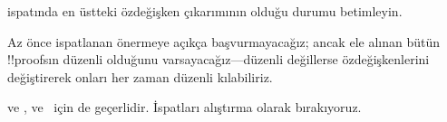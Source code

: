 \documentclass[../../../include/open-logic-section]{subfiles}
\begin{document}
\begin{prob}
 ispatında en üstteki özdeğişken çıkarımının
\Elim{\lexists} olduğu durumu betimleyin.
\end{prob}

Az önce ispatlanan önermeye açıkça başvurmayacağız; ancak ele alınan bütün
!!{proof}s{}ın düzenli olduğunu varsayacağız---düzenli değillerse
özdeğişkenlerini değiştirerek onları her zaman düzenli kılabiliriz.

 ve ,  ve~
için de geçerlidir. İspatları alıştırma olarak bırakıyoruz.
\end{document}
